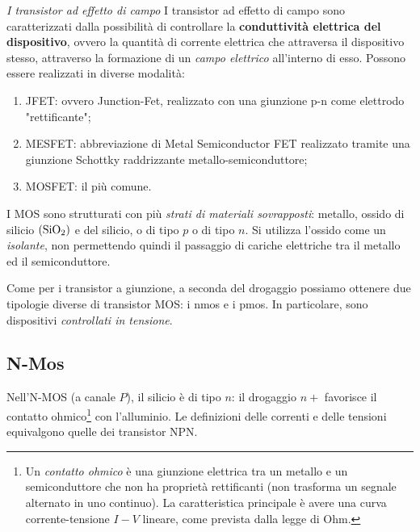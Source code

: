 \documentclass[
]{book}
\begin{document}
\begin{greenbox}{\emph{I transistor ad effetto di campo}}
I transistor ad effetto di campo sono caratterizzati dalla possibilità di controllare la \textbf{conduttività elettrica del dispositivo}, ovvero la quantità di corrente elettrica che attraversa il dispositivo stesso, attraverso la formazione di un \emph{campo elettrico}
all'interno di esso. \newline
Possono essere realizzati in diverse modalità: 
\begin{enumerate}
\item JFET: ovvero Junction-Fet, realizzato con una giunzione p-n come elettrodo "rettificante";
\item MESFET: abbreviazione di Metal Semiconductor FET realizzato tramite una giunzione Schottky raddrizzante metallo-semiconduttore; 
\item MOSFET: il più comune.
\end{enumerate}
\end{greenbox}

I MOS sono strutturati con più \emph{strati di materiali sovrapposti}:
metallo, ossido di silicio \((\ce{SiO_2})\) e del silicio, o di tipo
\(p\) o di tipo \(n\). Si utilizza l'ossido come un \emph{isolante}, non
permettendo quindi il passaggio di cariche elettriche tra il metallo ed
il semiconduttore.

Come per i transistor a giunzione, a seconda del drogaggio possiamo
ottenere due tipologie diverse di transistor MOS: i nmos e i pmos.
\newline In particolare, sono dispositivi \emph{controllati in
tensione}.

\subsection{N-Mos}\label{n-mos}

Nell'N-MOS (a canale \(P\)), il silicio è di tipo \(n\): il drogaggio
\(n+\) favorisce il contatto ohmico\footnote{Un \emph{contatto ohmico} è
  una giunzione elettrica tra un metallo e un semiconduttore che non ha
  proprietà rettificanti (non trasforma un segnale alternato in uno
  continuo). La caratteristica principale è avere una curva
  corrente-tensione \(I-V\) lineare, come prevista dalla legge di Ohm.}
con l'alluminio. Le definizioni delle correnti e delle tensioni
equivalgono quelle dei transistor NPN.
\end{document}
